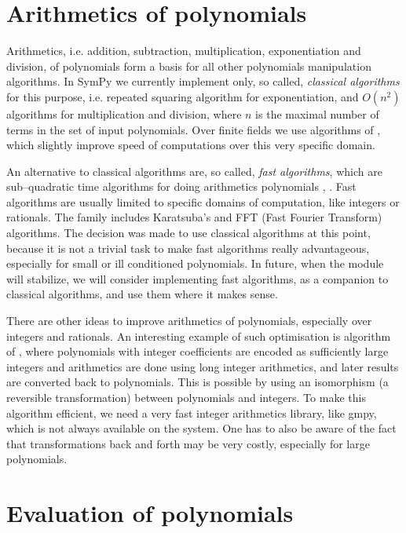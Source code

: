 \section{Arithmetics of polynomials}

Arithmetics, i.e. addition, subtraction, multiplication, exponentiation and division, of polynomials
form a basis for all other polynomials manipulation algorithms. In SymPy we currently implement only,
so called, \emph{classical algorithms} for this purpose, i.e. repeated squaring algorithm for exponentiation,
and $O(n^2)$ algorithms for multiplication and division, where $n$ is the maximal number of terms in
the set of input polynomials. Over finite fields we use algorithms of \cite{Monagan1993inplace}, which
slightly improve speed of computations over this very specific domain.

An alternative to classical algorithms are, so called, \emph{fast algorithms}, which are sub--quadratic
time algorithms for doing arithmetics polynomials \cite{Moenck1976practical}, \cite{Bernstein2008fast}. Fast
algorithms are usually limited to specific domains of computation, like integers or rationals. The
family includes Karatsuba's and FFT (Fast Fourier Transform) algorithms. The decision was made to use
classical algorithms at this point, because it is not a trivial task to make fast algorithms really
advantageous, especially for small or ill conditioned polynomials. In future, when the module will
stabilize, we will consider implementing fast algorithms, as a companion to classical algorithms,
and use them where it makes sense.

There are other ideas to improve arithmetics of polynomials, especially over integers and rationals.
An interesting example of such optimisation is algorithm of \cite{Fateman2005encoding}, where polynomials
with integer coefficients are encoded as sufficiently large integers and arithmetics are done using
long integer arithmetics, and later results are converted back to polynomials. This is possible by
using an isomorphism (a reversible transformation) between polynomials and integers. To make this
algorithm efficient, we need a very fast integer arithmetics library, like gmpy, which is not always
available on the system. One has to also be aware of the fact that transformations back and forth
may be very costly, especially for large polynomials.


\section{Evaluation of polynomials}

